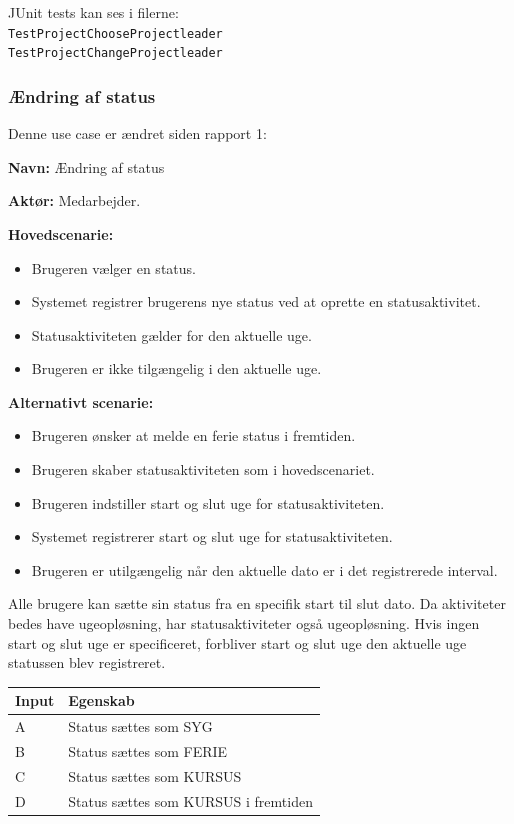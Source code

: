 JUnit tests kan ses i filerne: \\
\texttt{TestProjectChooseProjectleader} \\
\texttt{TestProjectChangeProjectleader}

\subsubsection{Ændring af status}

Denne use case er ændret siden rapport 1:

\textbf{Navn:} Ændring af status

\textbf{Aktør:} Medarbejder.

\textbf{Hovedscenarie: }
    
\begin{itemize}
    \item Brugeren vælger en status.
    \item Systemet registrer brugerens nye status ved at oprette en statusaktivitet.
    \item Statusaktiviteten gælder for den aktuelle uge.
    \item Brugeren er ikke tilgængelig i den aktuelle uge.
\end{itemize}

\textbf{Alternativt scenarie:}

\begin{itemize}
    \item Brugeren ønsker at melde en ferie status i fremtiden.
    \item Brugeren skaber statusaktiviteten som i hovedscenariet.
    \item Brugeren indstiller start og slut uge for statusaktiviteten.
    \item Systemet registrerer start og slut uge for statusaktiviteten.
    \item Brugeren er utilgængelig når den aktuelle dato er i det registrerede interval.
\end{itemize}

Alle brugere kan sætte sin status fra en specifik start til slut dato. Da aktiviteter bedes have ugeopløsning, har statusaktiviteter også ugeopløsning. Hvis ingen start og slut uge er specificeret, forbliver start og slut uge den aktuelle uge statussen blev registreret. 

\begin{table}[H]
    \centering
    \begin{tabular}{|l|l|}
    \hline
    \textbf{Input} & \textbf{Egenskab}                                    \\ \hline
    A     & Status sættes som SYG                       \\ \hline
    B     & Status sættes som FERIE                     \\ \hline
    C     & Status sættes som KURSUS                    \\ \hline
    D     & Status sættes som KURSUS i fremtiden        \\ \hline
    \end{tabular}
\end{table}


